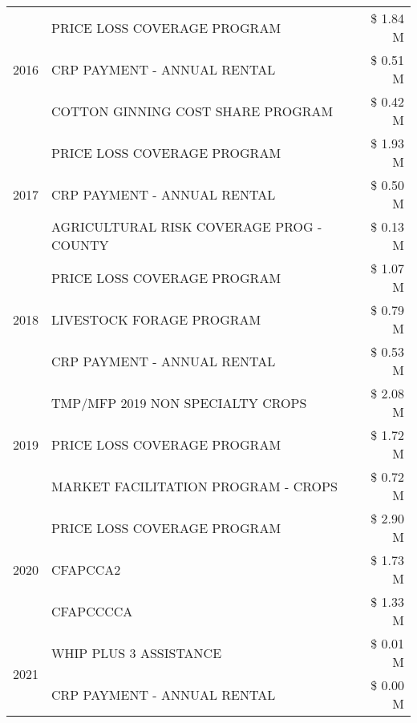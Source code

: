 \begin{tabular}{llr}
\cline{1-3}
\multirow[t]{3}{*}{2016} & PRICE LOSS COVERAGE PROGRAM & \$ 1.84 M \\
 & CRP PAYMENT - ANNUAL RENTAL & \$ 0.51 M \\
 & COTTON GINNING COST SHARE PROGRAM & \$ 0.42 M \\
\cline{1-3}
\multirow[t]{3}{*}{2017} & PRICE LOSS COVERAGE PROGRAM & \$ 1.93 M \\
 & CRP PAYMENT - ANNUAL RENTAL & \$ 0.50 M \\
 & AGRICULTURAL RISK COVERAGE PROG - COUNTY & \$ 0.13 M \\
\cline{1-3}
\multirow[t]{3}{*}{2018} & PRICE LOSS COVERAGE PROGRAM & \$ 1.07 M \\
 & LIVESTOCK FORAGE PROGRAM & \$ 0.79 M \\
 & CRP PAYMENT - ANNUAL RENTAL & \$ 0.53 M \\
\cline{1-3}
\multirow[t]{3}{*}{2019} & TMP/MFP 2019 NON SPECIALTY CROPS & \$ 2.08 M \\
 & PRICE LOSS COVERAGE PROGRAM & \$ 1.72 M \\
 & MARKET FACILITATION PROGRAM - CROPS & \$ 0.72 M \\
\cline{1-3}
\multirow[t]{3}{*}{2020} & PRICE LOSS COVERAGE PROGRAM & \$ 2.90 M \\
 & CFAPCCA2 & \$ 1.73 M \\
 & CFAPCCCCA & \$ 1.33 M \\
\cline{1-3}
\multirow[t]{2}{*}{2021} & WHIP PLUS 3 ASSISTANCE & \$ 0.01 M \\
 & CRP PAYMENT - ANNUAL RENTAL & \$ 0.00 M \\
\cline{1-3}
\bottomrule
\end{tabular}
